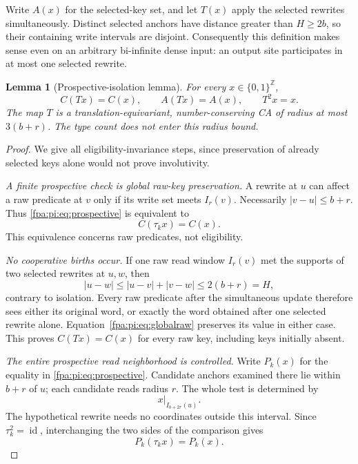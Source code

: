 \documentclass[11pt,a4paper]{article}
\numberwithin{equation}{section}
\newtheorem{lemma}[theorem]{Lemma}
\newcommand{\X}{\{0,1\}^{\mathbb Z}}\newcommand{\id}{\operatorname{id}}
\begin{document}
Write $A(x)$ for the selected-key set, and let $T(x)$ apply the selected rewrites simultaneously. Distinct selected anchors have distance greater than $H\ge2b$, so their containing write intervals are disjoint. Consequently this definition makes sense even on an arbitrary bi-infinite dense input: an output site participates in at most one selected rewrite.

\begin{lemma}[Prospective-isolation lemma]\label{fpa:pi:lem:parallel}
For every $x\in\X$,
\[
 C(Tx)=C(x),\qquad A(Tx)=A(x),\qquad T^2x=x.
\]
The map $T$ is a translation-equivariant, number-conserving CA of radius at most $3(b+r)$. The type count does not enter this radius bound.
\end{lemma}
\begin{proof}
We give all eligibility-invariance steps, since preservation of already selected keys alone would not prove involutivity.

\emph{A finite prospective check is global raw-key preservation.} A rewrite at $u$ can affect a raw predicate at $v$ only if its write set meets $I_r(v)$. Necessarily $|v-u|\le b+r$. Thus \eqref{fpa:pi:eq:prospective} is equivalent to
\begin{equation}\label{fpa:pi:eq:globalraw}
 C(\tau_kx)=C(x).
\end{equation}
This equivalence concerns raw predicates, not eligibility.

\emph{No cooperative births occur.} If one raw read window $I_r(v)$ met the supports of two selected rewrites at $u,w$, then
\[
 |u-w|\le |u-v|+|v-w|\le2(b+r)=H,
\]
contrary to isolation. Every raw predicate after the simultaneous update therefore sees either its original word, or exactly the word obtained after one selected rewrite alone. Equation~\eqref{fpa:pi:eq:globalraw} preserves its value in either case. This proves $C(Tx)=C(x)$ for every raw key, including keys initially absent.

\emph{The entire prospective read neighborhood is controlled.} Write $P_k(x)$ for the equality in \eqref{fpa:pi:eq:prospective}. Candidate anchors examined there lie within $b+r$ of $u$; each candidate reads radius $r$. The whole test is determined by
\begin{equation}\label{fpa:pi:eq:prospectivewindow}
 x|_{I_{b+2r}(u)}.
\end{equation}
The hypothetical rewrite needs no coordinates outside this interval. Since $\tau_k^2=\id$, interchanging the two sides of the comparison gives
\begin{equation}\label{fpa:pi:eq:owninvariance}
 P_k(\tau_kx)=P_k(x).
\end{equation}


\end{proof}
\end{document}
